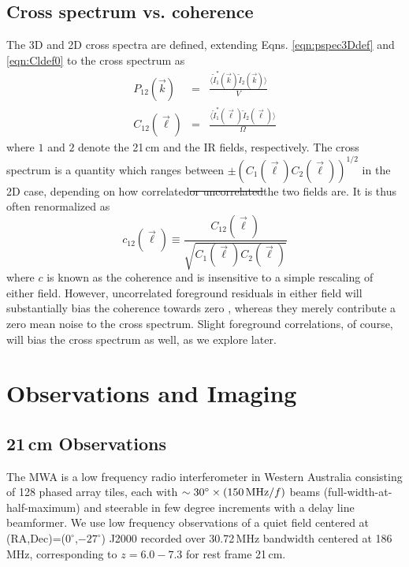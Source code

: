 \documentclass[numberedappendix]{emulateapj}
\providecommand{\DIFadd}[1]{{\protect\color{blue}\uwave{#1}}} %
\providecommand{\DIFdel}[1]{{\protect\color{red}\sout{#1}}}                      %
\providecommand{\DIFaddbegin}{} %
\providecommand{\DIFaddend}{} %
\providecommand{\DIFdelbegin}{} %
\providecommand{\DIFdelend}{} %
\begin{document}
\subsection{Cross spectrum vs. coherence}

The 3D and 2D cross spectra are defined, extending Eqns. \ref{eqn:pspec3Ddef} and \ref{eqn:Cldef0} to the cross spectrum as
\begin{eqnarray}
	P_{12}(\vec{k}) &=& \frac{\langle\tilde{I}_1^*(\vec{k})\tilde{I}_2(\vec{k})\rangle}{V}\\
	C_{12}(\vec{\ell}) &=& \frac{\langle \tilde{I}_1^*(\vec{\ell})\tilde{I}_2(\vec{\ell})\rangle}{\Omega}
\end{eqnarray}
where $1$ and $2$ denote the 21\,cm and the IR fields, respectively. The cross spectrum is a quantity which ranges between $\pm(C_{1}(\vec{\ell})C_{2}(\vec{\ell}))^{1/2}$ in the 2D case, depending on how correlated\DIFdelbegin \DIFdel{or uncorrelated}\DIFdelend \DIFaddbegin \DIFadd{, uncorrelated, or anticorrelated }\DIFaddend the two fields are. It is thus often renormalized as  
\begin{equation}
\label{eqn:Cldefcross}
	c_{12}(\vec{\ell}) \equiv \frac{C_{12}(\vec{\ell}) }{\sqrt{C_1(\vec{\ell})  C_2(\vec{\ell}) }}
\end{equation}
where $c$ is known as the coherence and is insensitive to a simple rescaling of either field. However, uncorrelated foreground residuals in either field will substantially bias the coherence towards zero \citep{lidz09,furlanettolidz07}, whereas they merely contribute a zero mean noise to the cross spectrum. Slight foreground correlations, of course, will bias the cross spectrum as well, as we explore later. 

\section{Observations and Imaging}
\subsection{21\,cm Observations}
\label{sec:mwaobservations}

The MWA is a low frequency radio interferometer in Western Australia consisting of 128 phased array tiles, each with $\sim30^\circ\times(150\text{\,MHz}/f)$  beams (full-width-at-half-maximum) and steerable in few degree increments with a delay line beamformer. We use low frequency observations of a quiet field centered at (RA,Dec)=($0^\circ$,$-27^\circ$) J2000 recorded over 30.72\,MHz bandwidth centered at 186\,MHz, corresponding to $z=6.0-7.3$ for rest frame 21\,cm. 
\end{document}
